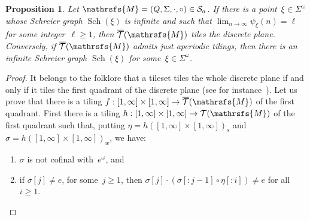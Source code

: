 \documentclass{amsart}
\newtheorem{proposition}[theorem]{Proposition}
\begin{document}
{\begin{proposition}\label{prop: almost equiv conditions to have a tiling}
Let ${{{\mathrsfs{{M}}}}}=({{{Q}}},{{{\Sigma}}},{{{\cdot}}},{{{\circ}}})\in{\hbox{${\mathcal S}_{a}$}}$. If there is a point~$\xi\in {{{\Sigma}}}^{\omega}$ whose Schreier graph $\operatorname{Sch}(\xi)$ is infinite and such that $\lim_{n\rightarrow \infty} \psi_{\xi}(n)=\ell$ for some integer~$\ell\ge 1$, then $\overline{\mathcal{T}}({{{\mathrsfs{{M}}}}})$ tiles the discrete plane. Conversely, if $\overline{\mathcal{T}}({{{\mathrsfs{{M}}}}})$ admits just aperiodic tilings, then there is an infinite Schreier graph $\operatorname{Sch}(\xi)$ for some~$\xi\in {{{\Sigma}}}^{\omega}$. 
\end{proposition}
\begin{proof}
It belongs to the folklore that a tileset tiles the whole discrete plane
if and only if it tiles the first quadrant of the discrete plane
(see for instance~\cite{Robinson}).
Let us prove that there is a tiling $f:[1,\infty]\times[1,\infty]\rightarrow \overline{\mathcal{T}}({{{\mathrsfs{{M}}}}})$ of the first quadrant. First there is a tiling   $h:[1,\infty]\times[1,\infty]\rightarrow \mathcal{T}({{{\mathrsfs{{M}}}}})$ of the first quadrant such that, putting
$
\eta=h\left([1,\infty]\times [1,\infty]\right)_{s}$ and $  \sigma=h\left([1,\infty]\times [1,\infty]\right)_{w}
$, we have:
\begin{enumerate}
\item \label{prop-aper-proof1}$\sigma$ is not cofinal with~$e^{\omega}$, and
\item \label{prop-aper-proof2}if $\sigma[j]\neq
e$, for some~$j\ge 1$, then $\sigma[j]{{{\cdot}}} (\sigma[:j-1]{{{\circ}}}\eta[:i])\neq e$ for all $i\ge 1$.
\end{enumerate}
\begin{figure}[h] \label{fig:tillschreier}
\end{figure}
\end{proof}}
\end{document}
